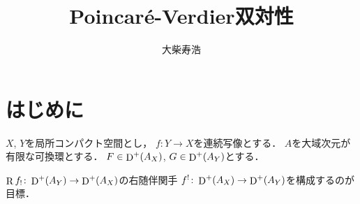 \theoremstyle{mystyle}
\newtheorem{AXM}{公理}[section]
\newtheorem{DFN}[Axiom]{定義}
\newtheorem{THM}[Axiom]{定理}
\newtheorem*{THM*}{定理}
\newtheorem{PRP}[Axiom]{命題}
\newtheorem{LMM}[Axiom]{補題}
\newtheorem{CRL}[Axiom]{系}
\newtheorem{EG}[Axiom]{例}
\newtheorem{CNV}[Axiom]{規約}
\newtheorem{CMT}[Axiom]{コメント}









\def\inner<#1>{\langle #1 \rangle}








\title{Poincar\'e-Verdier双対性}
\author{大柴寿浩
}
\date{}

\maketitle
\section*{はじめに}
\(X\), \(Y\)を局所コンパクト空間とし，
\(f\colon{Y}\to{X}\)を連続写像とする．
\(A\)を大域次元が有限な可換環とする．
\(F\in\mathop{\mathrm{D}}\nolimits^+(A_X)\), \(G\in\mathop{\mathrm{D}}\nolimits^+(A_Y)\)とする．

\(\mathop{\mathrm{R}}\nolimits{f_!}\colon\mathop{\mathrm{D}}\nolimits^+(A_Y)\to\mathop{\mathrm{D}}\nolimits^+(A_X)\)の右随伴関手
\(f^!\colon\mathop{\mathrm{D}}\nolimits^+(A_X)\to\mathop{\mathrm{D}}\nolimits^+(A_Y)\)を構成するのが目標．

